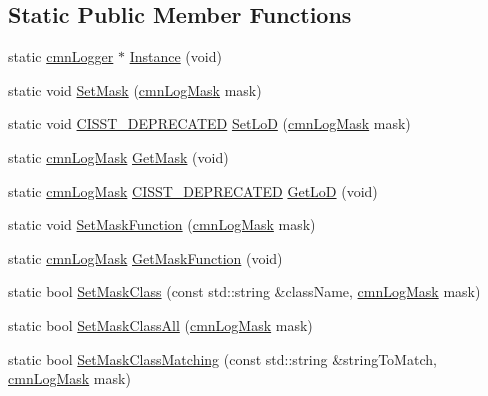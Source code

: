 \subsection*{Static Public Member Functions}
\begin{DoxyCompactItemize}
\item 
static \hyperlink{classcmn_logger}{cmn\+Logger} $\ast$ \hyperlink{classcmn_logger_af147d525d01803626e171c328bc28530}{Instance} (void)
\item 
static void \hyperlink{classcmn_logger_aa1b05cddbe0f496c381453656a21af7d}{Set\+Mask} (\hyperlink{cmn_log_lo_d_8h_a44b6ef7560b0d204460b0a54f1a5d702}{cmn\+Log\+Mask} mask)
\item 
static void \hyperlink{cmn_portability_8h_a63da7164735f9501be651b1f2bbc0121}{C\+I\+S\+S\+T\+\_\+\+D\+E\+P\+R\+E\+C\+A\+T\+E\+D} \hyperlink{classcmn_logger_af1c8a409a0667a9abb6003c3e89a82c4}{Set\+Lo\+D} (\hyperlink{cmn_log_lo_d_8h_a44b6ef7560b0d204460b0a54f1a5d702}{cmn\+Log\+Mask} mask)
\item 
static \hyperlink{cmn_log_lo_d_8h_a44b6ef7560b0d204460b0a54f1a5d702}{cmn\+Log\+Mask} \hyperlink{classcmn_logger_a96c349facac6bbc27220b091ff26a838}{Get\+Mask} (void)
\item 
static \hyperlink{cmn_log_lo_d_8h_a44b6ef7560b0d204460b0a54f1a5d702}{cmn\+Log\+Mask} \hyperlink{cmn_portability_8h_a63da7164735f9501be651b1f2bbc0121}{C\+I\+S\+S\+T\+\_\+\+D\+E\+P\+R\+E\+C\+A\+T\+E\+D} \hyperlink{classcmn_logger_aa971af396f5e242a175d9b54be9064c5}{Get\+Lo\+D} (void)
\item 
static void \hyperlink{classcmn_logger_afa246173cc26b1fa0bac407842dfd31c}{Set\+Mask\+Function} (\hyperlink{cmn_log_lo_d_8h_a44b6ef7560b0d204460b0a54f1a5d702}{cmn\+Log\+Mask} mask)
\item 
static \hyperlink{cmn_log_lo_d_8h_a44b6ef7560b0d204460b0a54f1a5d702}{cmn\+Log\+Mask} \hyperlink{classcmn_logger_ac9a9ba32485a733c51bc7927f76b2355}{Get\+Mask\+Function} (void)
\item 
static bool \hyperlink{classcmn_logger_ac02d8a05e26687bf66951aab021adad7}{Set\+Mask\+Class} (const std\+::string \&class\+Name, \hyperlink{cmn_log_lo_d_8h_a44b6ef7560b0d204460b0a54f1a5d702}{cmn\+Log\+Mask} mask)
\item 
static bool \hyperlink{classcmn_logger_a88413527ca33537b0d13d1a9645c46a4}{Set\+Mask\+Class\+All} (\hyperlink{cmn_log_lo_d_8h_a44b6ef7560b0d204460b0a54f1a5d702}{cmn\+Log\+Mask} mask)
\item 
static bool \hyperlink{classcmn_logger_ae835d053611487f98a3d216ca8ca6f28}{Set\+Mask\+Class\+Matching} (const std\+::string \&string\+To\+Match, \hyperlink{cmn_log_lo_d_8h_a44b6ef7560b0d204460b0a54f1a5d702}{cmn\+Log\+Mask} mask)

\end{DoxyCompactItemize}
